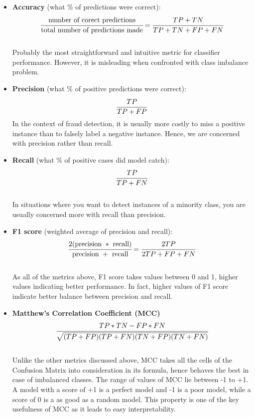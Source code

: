 \begin{itemize}
  \item \textbf{Accuracy} (what \% of predictions were correct): $$ \cfrac{\text{number of corect predictions}}{\text{total number of predictions made}} = \cfrac{TP + TN}{TP + TN + FP + FN}$$ \\
        Probably the most straightforward and intuitive metric for classifier performance. However, it is misleading when confronted with class imbalance problem. \\

  \item \textbf{Precision} (what \% of positive predictions were correct): $$ \cfrac{TP}{TP + FP}$$
        In the context of fraud detection, it is usually more costly to miss a positive instance than to falsely label a negative instance. Hence, we are concerned with precision rather than recall. \\

  \item \textbf{Recall} (what \% of positive cases did model catch): $$ \cfrac{TP}{TP + FN}$$ \\
        In situations where you want to detect instances of a minority class, you are usually concerned more with recall than precision. \\

  \item \textbf{F1 score} (weighted average of precision and recall): $$ \cfrac{2(\text{precision} \ * \ \text{recall})}{\text{precision} \ + \ \text{recall}} = \cfrac{2TP}{2TP + FP + FN}$$ \\
        As all of the metrics above, F1 score takes values between 0 and 1, higher values indicating better performance. In fact, higher values of F1 score indicate better balance between precision and recall. \\

  \item \textbf{Matthew's Correlation Coefficient (MCC)} $$ \cfrac{TP * TN - FP * FN}{\sqrt{(TP + FP)(TP + FN)(TN + FP)(TN + FN)}}$$ \\
        Unlike the other metrics discussed above, MCC takes all the cells of the Confusion Matrix into consideration in its formula, hence behaves the best in case of imbalanced classes. The range of values of MCC lie between -1 to +1. A model with a score of +1 is a perfect model and -1 is a poor model, while a score of 0 is a as good as a random model. This property is one of the key usefulness of MCC as it leads to easy interpretability. \\
\end{itemize}

